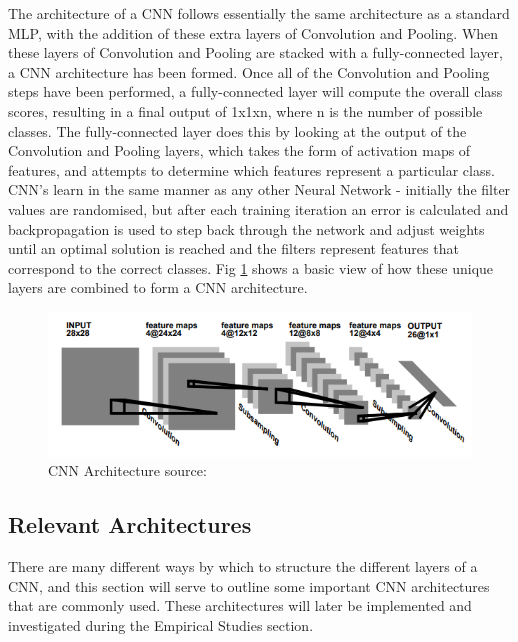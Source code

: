 \documentclass[12pt]{report}
\begin{document}
\begin{flushleft}
The architecture of a CNN follows essentially the same architecture as a standard MLP, with the addition of these extra layers of Convolution and Pooling. When these layers of Convolution and Pooling are stacked with a fully-connected layer, a CNN architecture has been formed. Once all of the Convolution and Pooling steps have been performed, a fully-connected layer will compute the overall class scores, resulting in a final output of 1x1xn, where n is the number of possible classes. The fully-connected layer does this by looking at the output of the Convolution and Pooling layers, which takes the form of activation maps of features, and attempts to determine which features represent a particular class. 
\linebreak
\linebreak
CNN's learn in the same manner as any other Neural Network - initially the filter values are randomised, but after each training iteration an error is calculated and backpropagation is used to step back through the network and adjust weights until an optimal solution is reached and the filters represent features that correspond to the correct classes. Fig \ref{fig:convo} shows a basic view of how these unique layers are combined to form a CNN architecture.
\end{flushleft}

\vspace{0.5cm}
\begin{figure}[ht!]
	\centering
	\includegraphics[width=12cm]{convo}
	\caption{CNN Architecture source: \cite{lecun1995convolutional}}
	\label{fig:convo}
\end{figure}

\newpage
\subsection{Relevant Architectures}
\begin{flushleft}
There are many different ways by which to structure the different layers of a CNN, and this section will serve to outline some important CNN architectures that are commonly used. These architectures will later be implemented and investigated during the Empirical Studies section.
\end{flushleft}
\end{document}

